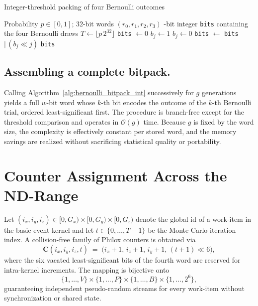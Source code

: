 \begin{algorithm}[H]
  \caption{Integer-threshold packing of four Bernoulli outcomes}
  \label{alg:bernoulli_bitpack_int}
  \begin{algorithmic}[1]
    \Require Probability $p\in[0,1]$; 32-bit words $(r_0,r_1,r_2,r_3)$
    -bit integer \texttt{bits} containing the four Bernoulli draws
    \State $T \gets \lfloor p\,2^{32}\rfloor$ 
    \State \texttt{bits} $\gets 0$
        \State $b_j \gets 1$
      \Else
        \State $b_j \gets 0$
      \EndIf
      \State \texttt{bits} $\gets$ \texttt{bits} $\mid\, (b_j \ll j)$
    \EndFor
    \State \Return \texttt{bits}
  \end{algorithmic}
\end{algorithm}

\subsection{Assembling a complete bitpack.}  Calling Algorithm~\ref{alg:bernoulli_bitpack_int} successively for $g$ generations yields a full \(w\)-bit word whose $k$-th bit encodes the outcome of the $k$-th Bernoulli trial, ordered least-significant first.  The procedure is branch-free except for the threshold comparison and operates in $\mathcal{O}(g)$ time.  Because $g$ is fixed by the word size, the complexity is effectively constant per stored word, and the memory savings are realized without sacrificing statistical quality or portability.

\section{Counter Assignment Across the ND-Range}
\label{subsec:counter_assignment}

Let $(i_x,i_y,i_z)\in[0,G_x)\times[0,G_y)\times[0,G_z)$ denote the global id of a work-item in the basic-event kernel and let $t\in\{0,\dots,T-1\}$ be the Monte-Carlo iteration index.  A collision-free family of Philox counters is obtained via
\[
   \mathbf{C}(i_x,i_y,i_z,t)
   \;=\;
   \bigl(i_{x}+1,\, i_{z}+1,\, i_{y}+1,\, (t+1)\ll 6\bigr),
\]
where the six vacated least-significant bits of the fourth word are reserved for intra-kernel increments.  The mapping is bijective onto
\[
   \{1,\dots,V\}\times\{1,\dots,P\}\times\{1,\dots,B\}\times\{1,\dots,2^{6}\},
\]
guaranteeing independent pseudo-random streams for every work-item without synchronization or shared state.